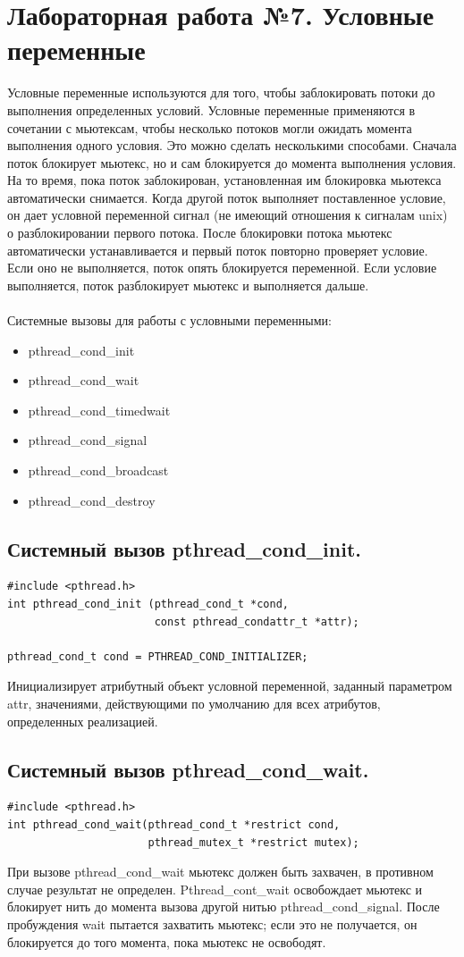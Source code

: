 \documentclass[a4paper]{article}
\begin{document}
\section{\bf Лабораторная работа №7. Условные переменные}
Условные переменные используются для того, чтобы заблокировать потоки до выполнения определенных условий. Условные переменные применяются в сочетании с мьютексам, чтобы несколько потоков могли ожидать момента выполнения одного условия. Это можно сделать несколькими способами. Сначала поток блокирует мьютекс, но и сам блокируется до момента выполнения условия. На то время, пока поток заблокирован, установленная им блокировка мьютекса автоматически снимается. Когда другой поток выполняет поставленное условие, он дает условной переменной сигнал (не имеющий отношения к сигналам unix) о разблокировании первого потока. После блокировки потока мьютекс автоматически устанавливается и первый поток повторно проверяет условие. Если оно не выполняется, поток опять блокируется переменной. Если условие выполняется, поток разблокирует мьютекс и выполняется дальше.\\\\
Системные вызовы для работы с условными переменными:
\begin{itemize}
  \item pthread\_cond\_init
  \item pthread\_cond\_wait
  \item pthread\_cond\_timedwait
  \item pthread\_cond\_signal
  \item pthread\_cond\_broadcast
  \item pthread\_cond\_destroy
\end{itemize}

\subsection{\Large Системный вызов pthread\_cond\_init.}
\begin{verbatim}
#include <pthread.h>
int pthread_cond_init (pthread_cond_t *cond,
                       const pthread_condattr_t *attr);

pthread_cond_t cond = PTHREAD_COND_INITIALIZER;
\end{verbatim}
Инициализирует атрибутный объект условной переменной, заданный параметром attr, значениями, действующими по умолчанию для всех атрибутов, определенных реализацией.

\subsection{\Large Системный вызов pthread\_cond\_wait.}
\begin{verbatim}
#include <pthread.h>
int pthread_cond_wait(pthread_cond_t *restrict cond, 
                      pthread_mutex_t *restrict mutex);
\end{verbatim}
При вызове pthread\_cond\_wait мьютекс должен быть захвачен, в противном случае результат не определен. Pthread\_cont\_wait освобождает мьютекс и блокирует нить до момента вызова другой нитью pthread\_cond\_signal. После пробуждения wait пытается захватить мьютекс; если это не получается, он блокируется до того момента, пока мьютекс не освободят.
\end{document}
